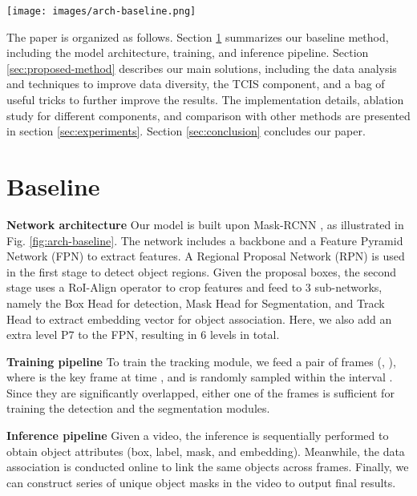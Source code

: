 \documentclass[10pt,twocolumn,letterpaper]{article}
\begin{document}
\begin{figure*}[!th]
	\centering
	\texttt{[image: images/arch-baseline.png]}
	\caption{\small Our baseline framework is based on Mask-RCNN \cite{mask-rcnn}. It has a Backbone, a Feature Pyramid Network with 6 levels, an RPN head in the first stage. The second stage has three branches: object bounding box detection, instance mask segmentation, and object track heads.}
	\label{fig:arch-baseline}
\end{figure*}

The paper is organized as follows. Section \ref{sec:baseline} summarizes our baseline method, including the model architecture, training, and inference pipeline. Section \ref{sec:proposed-method} describes our main solutions, including the data analysis and techniques to improve data diversity, the TCIS component, and a bag of useful tricks to further improve the results. The implementation details, ablation study for different components, and comparison with other methods are presented in section \ref{sec:experiments}. Section \ref{sec:conclusion} concludes our paper.
 

\section{Baseline}
\label{sec:baseline}
\noindent \textbf{Network architecture} Our model is built upon Mask-RCNN \cite{mask-rcnn}, as illustrated in Fig. \ref{fig:arch-baseline}. The network includes a backbone and a Feature Pyramid Network (FPN) \cite{lin2017feature} to extract features. A Regional Proposal Network (RPN) is used in the first stage to detect object regions. Given the proposal boxes, the second stage uses a RoI-Align operator to crop features and feed to 3 sub-networks, namely the Box Head for detection, Mask Head for Segmentation, and Track Head \cite{quasi-dense} to extract embedding vector for object association. Here, we also add an extra level P7 to the FPN, resulting in 6 levels in total.

\noindent \textbf{Training pipeline} To train the tracking module, we feed a pair of frames (, ), where  is the key frame at time , and  is randomly sampled within the interval . Since they are significantly overlapped, either one of the frames is sufficient for training the detection and the segmentation modules.

\noindent \textbf{Inference pipeline} Given a video, the inference is sequentially performed to obtain object attributes (box, label, mask, and embedding). Meanwhile, the data association is conducted online to link the same objects across frames. Finally, we can construct series of unique object masks in the video to output final results.
 
\end{document}
